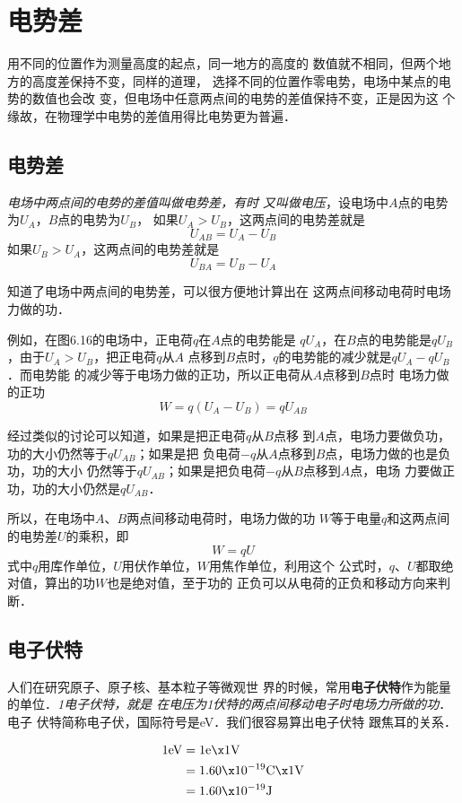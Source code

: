 \section{电势差}
用不同的位置作为测量高度的起点，同一地方的高度的
数值就不相同，但两个地方的高度差保持不变，同样的道理，
选择不同的位置作零电势，电场中某点的电势的数值也会改
变，但电场中任意两点间的电势的差值保持不变，正是因为这
个缘故，在物理学中电势的差值用得比电势更为普遍．

\subsection{电势差}
\textit{电场中两点间的电势的差值叫做电势差，有时
又叫做电压}，设电场中$A$点的电势为$U_A$，$B$点的电势为$U_B$，
如果$U_A>U_B$，这两点间的电势差就是
\[U_{AB}=U_A-U_B \]
如果$U_B>U_A$，这两点间的电势差就是
\[U_{BA}=U_B-U_A \]

知道了电场中两点间的电势差，可以很方便地计算出在
这两点间移动电荷时电场力做的功．

例如，在图6.16的电场中，正电荷$q$在$A$点的电势能是
$qU_A$，在$B$点的电势能是$qU_B$，由于$U_A>U_B$，把正电荷$q$从$A$
点移到$B$点时，$q$的电势能的减少就是$qU_A-qU_B$．而电势能
的减少等于电场力做的正功，所以正电荷从$A$点移到$B$点时
电场力做的正功
\[W=q(U_A-U_B)=qU_{AB}\]

经过类似的讨论可以知道，如果是把正电荷$q$从$B$点移
到$A$点，电场力要做负功，功的大小仍然等于$qU_{AB}$；如果是把
负电荷$-q$从$A$点移到$B$点，电场力做的也是负功，功的大小
仍然等于$qU_{AB}$；如果是把负电荷$-q$从$B$点移到$A$点，电场
力要做正功，功的大小仍然是$qU_{AB}$．

所以，在电场中$A$、$B$两点间移动电荷时，电场力做的功
$W$等于电量$q$和这两点间的电势差$U$的乘积，即
\[W=qU\]
式中$q$用库作单位，$U$用伏作单位，$W$用焦作单位，利用这个
公式时，$q$、$U$都取绝对值，算出的功$W$也是绝对值，至于功的
正负可以从电荷的正负和移动方向来判断．

\subsection{电子伏特}


人们在研究原子、原子核、基本粒子等微观世
界的时候，常用\textbf{电子伏特}作为能量的单位．\textit{1电子伏特，就是
在电压为1伏特的两点间移动电子时电场力所做的功}．
电子
伏特简称电子伏，国际符号是eV．我们很容易算出电子伏特
跟焦耳的关系．

\[\begin{split}
	1{\rm eV}&=1{\rm e}\x 1{\rm V}\\
	&=1.60\x 10^{-19}{\rm C}\x 1{\rm V}\\
&=1.60\x 10^{-19}{\rm J}	
\end{split}	\]


